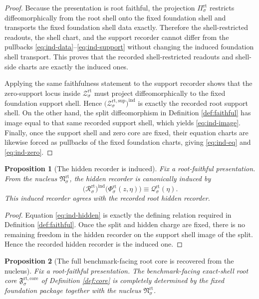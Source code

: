 \documentclass[11pt]{article}
\newcommand{\RootProj}[1]{\Pi_{#1}^{\mathrm{rt}}}
\newcommand{\RootShellSet}[1]{\mathcal Z_{#1}^{\mathrm{rt}}}
\newcommand{\RootSupportShell}[1]{\mathcal Z_{#1}^{\mathrm{rt,sup}}}
\newcommand{\RootSplit}[1]{\Phi_{#1}^{\mathrm{rt}}}
\newcommand{\RootCharge}[1]{\mathcal Q_{#1}^{\mathrm{rt}}}
\newcommand{\RootResidual}[1]{\mathcal R_{#1}^{\mathrm{rt}}}
\newcommand{\RootCore}[1]{\mathfrak F_{#1}^{\mathrm{rt,core}}}
\newcommand{\RootNucleus}[1]{\mathfrak N_{#1}^{\mathrm{rt}}}
\newtheorem{proposition}{Proposition}
\begin{document}
\begin{proof}
Because the presentation is root faithful, the projection \(\RootProj{\sigma}\) restricts diffeomorphically from the root shell onto the fixed foundation shell and transports the fixed foundation shell data exactly. Therefore the shell-restricted readouts, the shell chart, and the support recorder cannot differ from the pullbacks \eqref{eq:ind-data}--\eqref{eq:ind-support} without changing the induced foundation shell transport. This proves that the recorded shell-restricted readouts and shell-side charts are exactly the induced ones.

Applying the same faithfulness statement to the support recorder shows that the zero-support locus inside \(\RootShellSet{\sigma}\) must project diffeomorphically to the fixed foundation support shell. Hence \(\bigl(\RootSupportShell{\sigma}\bigr)^{\mathrm{ind}}\) is exactly the recorded root support shell. On the other hand, the split diffeomorphism in Definition \ref{def:faithful} has image equal to that same recorded support shell, which yields \eqref{eq:ind-image}. Finally, once the support shell and zero core are fixed, their equation charts are likewise forced as pullbacks of the fixed foundation charts, giving \eqref{eq:ind-eq} and \eqref{eq:ind-zero}.
\end{proof}

\begin{proposition}[The hidden recorder is induced]
\label{prop:induced-hidden}
Fix a root-faithful presentation. From the nucleus \(\RootNucleus{\sigma}\), the hidden recorder is canonically induced by
\begin{equation}
\bigl(\RootResidual{\sigma}\bigr)^{\mathrm{ind}}\bigl(\RootSplit{\sigma}(z,\eta)\bigr)
\equiv
\RootCharge{\sigma}(\eta).
\label{eq:ind-hidden}
\end{equation}
This induced recorder agrees with the recorded root hidden recorder.
\end{proposition}

\begin{proof}
Equation \eqref{eq:ind-hidden} is exactly the defining relation required in Definition \ref{def:faithful}. Once the split and hidden charge are fixed, there is no remaining freedom in the hidden recorder on the support shell image of the split. Hence the recorded hidden recorder is the induced one.
\end{proof}

\begin{proposition}[The full benchmark-facing root core is recovered from the nucleus]
\label{prop:recover}
Fix a root-faithful presentation. The benchmark-facing exact-shell root core \(\RootCore{\sigma}\) of Definition \ref{def:core} is completely determined by the fixed foundation package together with the nucleus \(\RootNucleus{\sigma}\).
\end{proposition}
\end{document}
